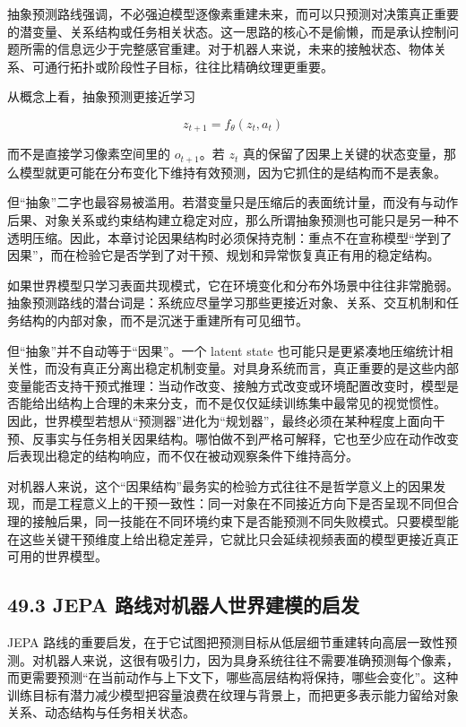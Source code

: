 抽象预测路线强调，不必强迫模型逐像素重建未来，而可以只预测对决策真正重要的潜变量、关系结构或任务相关状态。这一思路的核心不是偷懒，而是承认控制问题所需的信息远少于完整感官重建。对于机器人来说，未来的接触状态、物体关系、可通行拓扑或阶段性子目标，往往比精确纹理更重要。

从概念上看，抽象预测更接近学习

\begin{equation*}
z_{t+1} = f_\theta(z_t, a_t)
\end{equation*}

而不是直接学习像素空间里的 \(o_{t+1}\)。若 \(z_t\) 真的保留了因果上关键的状态变量，那么模型就更可能在分布变化下维持有效预测，因为它抓住的是结构而不是表象。

但“抽象”二字也最容易被滥用。若潜变量只是压缩后的表面统计量，而没有与动作后果、对象关系或约束结构建立稳定对应，那么所谓抽象预测也可能只是另一种不透明压缩。因此，本章讨论因果结构时必须保持克制：重点不在宣称模型“学到了因果”，而在检验它是否学到了对干预、规划和异常恢复真正有用的稳定结构。

如果世界模型只学习表面共现模式，它在环境变化和分布外场景中往往非常脆弱。抽象预测路线的潜台词是：系统应尽量学习那些更接近对象、关系、交互机制和任务结构的内部对象，而不是沉迷于重建所有可见细节。

但“抽象”并不自动等于“因果”。一个 latent state 也可能只是更紧凑地压缩统计相关性，而没有真正分离出稳定机制变量。对具身系统而言，真正重要的是这些内部变量能否支持干预式推理：当动作改变、接触方式改变或环境配置改变时，模型是否能给出结构上合理的未来分支，而不是仅仅延续训练集中最常见的视觉惯性。 因此，世界模型若想从“预测器”进化为“规划器”，最终必须在某种程度上面向干预、反事实与任务相关因果结构。哪怕做不到严格可解释，它也至少应在动作改变后表现出稳定的结构响应，而不仅在被动观察条件下维持高分。

对机器人来说，这个“因果结构”最务实的检验方式往往不是哲学意义上的因果发现，而是工程意义上的干预一致性：同一对象在不同接近方向下是否呈现不同但合理的接触后果，同一技能在不同环境约束下是否能预测不同失败模式。只要模型能在这些关键干预维度上给出稳定差异，它就比只会延续视频表面的模型更接近真正可用的世界模型。

\subsection*{49.3 JEPA 路线对机器人世界建模的启发}


JEPA 路线的重要启发，在于它试图把预测目标从低层细节重建转向高层一致性预测。对机器人来说，这很有吸引力，因为具身系统往往不需要准确预测每个像素，而更需要预测“在当前动作与上下文下，哪些高层结构将保持，哪些会变化”。这种训练目标有潜力减少模型把容量浪费在纹理与背景上，而把更多表示能力留给对象关系、动态结构与任务相关状态。

